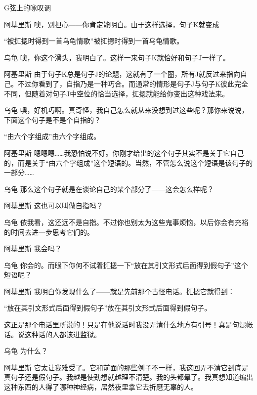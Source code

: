 \begin{dialog}{G弦上的咏叹调}
\begin{dialogue}
\item[阿基里斯]噢，别担心——你肯定能明白。由于这样选择，句子K就变成
\begin{block}
“被㧟摁时得到一首乌龟情歌”被㧟摁时得到一首乌龟情歌。
\end{block}

\item[乌龟]噢，你这个滑头，我明白了。这样一来句子K就恰好和句子J一样了。

\item[阿基里斯]由于句子K总是句子J的论题，这就有了一个圈，所有J就反过来指向自己。不过你看到了，自指乃是一种巧合。而通常的情形是句子J与句子K彼此完全不同，但随着对句子J中空位的恰当选择，㧟摁就能给你变出这种戏法来。

\item[乌龟]噢，好机巧啊。真奇怪，我自己怎么就从来没想到过这些呢？那你来说说，下面这个句子是不是个自指的？
\begin{block}
“由六个字组成”由六个字组成。
\end{block}

\item[阿基里斯]嗯嗯嗯……我恐怕说不好。你刚才给出的这个句子其实不是关于它自己的，而是关于“由六个字组成”这个短语的。当然，不管怎么说这个短语是该句子的一部分……

\item[乌龟]那么这个句子就是在谈论自己的某个部分了——这会怎么样呢？

\item[阿基里斯]这也可以叫做自指吗？

\item[乌龟]依我看，这还远不是自指。不过你也别太为这些鬼事烦恼，以后你会有充裕的时间去进一步思考它们的。

\item[阿基里斯]我会吗？

\item[乌龟]你会的。而眼下你何不试着㧟摁一下“放在其引文形式后面得到假句子”这个短语呢？

\item[阿基里斯]我明白你发现什么了——就是先前那个古怪电话。㧟摁它就得到：
\begin{block}
“放在其引文形式后面得到假句子”放在其引文形式后面得到假句子。
\end{block}

这正是那个电话里所说的！只是在他说话时我没弄清什么地方有引号！真是句混帐话。说这种话的人都该进监狱。

\item[乌龟]为什么？

\item[阿基里斯]它太让我难受了。它和前面的那些例子不一样，我这回弄不清它到底是真句子还是假句子。我越是使劲想就越理不清楚。我的头都晕了。我真想知道编出这种东西的人得了哪种神经病，居然夜里拿它去折磨无辜的人。


\end{dialogue}
\end{dialog}
